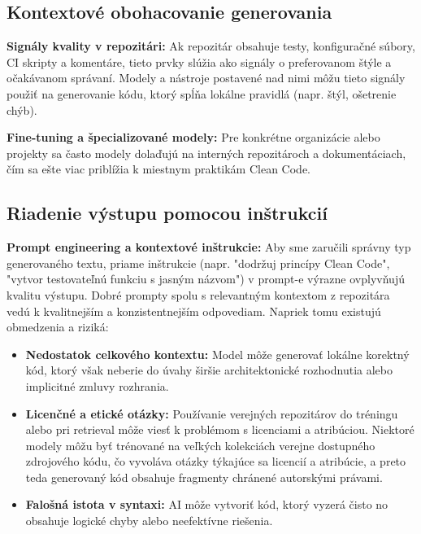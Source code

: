 \subsection{Kontextové obohacovanie generovania}

\textbf{Signály kvality v repozitári:} Ak repozitár obsahuje testy, konfiguračné súbory, CI skripty a komentáre, tieto prvky slúžia ako signály o preferovanom štýle a očakávanom správaní. Modely a nástroje postavené nad nimi môžu tieto signály použiť na generovanie kódu, ktorý spĺňa lokálne pravidlá (napr. štýl, ošetrenie chýb).
    
\textbf{Fine-tuning a špecializované modely:} Pre konkrétne organizácie alebo projekty sa často modely dolaďujú na interných repozitároch a dokumentáciach, čím sa ešte viac priblížia k miestnym praktikám Clean Code.
    
\subsection{Riadenie výstupu pomocou inštrukcií}

\textbf{Prompt engineering a kontextové inštrukcie:} Aby sme zaručili správny typ generovaného textu, priame inštrukcie (napr. "dodržuj princípy Clean Code", "vytvor testovateľnú funkciu s jasným názvom") v prompt-e výrazne ovplyvňujú kvalitu výstupu. Dobré prompty spolu s relevantným kontextom z repozitára vedú k kvalitnejším a konzistentnejším odpovediam. Napriek tomu existujú obmedzenia a riziká:

\begin{itemize}
    \item \textbf{Nedostatok celkového kontextu:} Model môže generovať lokálne korektný kód, ktorý však neberie do úvahy širšie architektonické rozhodnutia alebo implicitné zmluvy rozhrania.
    
    \item \textbf{Licenčné a etické otázky:} Používanie verejných repozitárov do tréningu alebo pri retrieval môže viesť k problémom s licenciami a atribúciou. Niektoré modely môžu byť trénované na veľkých kolekciách verejne dostupného zdrojového kódu, čo vyvoláva otázky týkajúce sa licencií a atribúcie, a preto teda generovaný kód  obsahuje fragmenty chránené autorskými právami.
    
    \item \textbf{Falošná istota v syntaxi:} AI môže vytvoriť kód, ktorý vyzerá čisto no obsahuje logické chyby alebo neefektívne riešenia.
\end{itemize}

